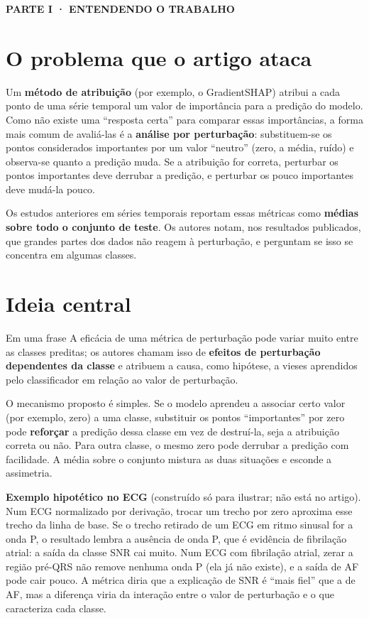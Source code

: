 \documentclass[11pt,a4paper]{article}
\newcommand{\partbar}[1]{\par\vspace{1.2em}\noindent\colorbox{black!80}{\parbox{\dimexpr\linewidth-2\fboxsep}{\color{white}\bfseries\sffamily\MakeUppercase{#1}}}\par\vspace{0.4em}}
\begin{document}
\partbar{Parte I · Entendendo o trabalho}

\section{O problema que o artigo ataca}
Um \textbf{método de atribuição} (por exemplo, o GradientSHAP) atribui a cada ponto de uma série temporal um valor de importância para a predição do modelo. Como não existe uma “resposta certa” para comparar essas importâncias, a forma mais comum de avaliá-las é a \textbf{análise por perturbação}: substituem-se os pontos considerados importantes por um valor “neutro” (zero, a média, ruído) e observa-se quanto a predição muda. Se a atribuição for correta, perturbar os pontos importantes deve derrubar a predição, e perturbar os pouco importantes deve mudá-la pouco.

Os estudos anteriores em séries temporais reportam essas métricas como \textbf{médias sobre todo o conjunto de teste}. Os autores notam, nos resultados publicados, que grandes partes dos dados não reagem à perturbação, e perguntam se isso se concentra em algumas classes.

\section{Ideia central}
\begin{infobox}[note]{Em uma frase}
A eficácia de uma métrica de perturbação pode variar muito entre as classes preditas; os autores chamam isso de \textbf{efeitos de perturbação dependentes da classe} e atribuem a causa, como hipótese, a vieses aprendidos pelo classificador em relação ao valor de perturbação.
\end{infobox}
O mecanismo proposto é simples. Se o modelo aprendeu a associar certo valor (por exemplo, zero) a uma classe, substituir os pontos “importantes” por zero pode \textbf{reforçar} a predição dessa classe em vez de destruí-la, seja a atribuição correta ou não. Para outra classe, o mesmo zero pode derrubar a predição com facilidade. A média sobre o conjunto mistura as duas situações e esconde a assimetria.

\textbf{Exemplo hipotético no ECG} (construído só para ilustrar; não está no artigo). Num ECG normalizado por derivação, trocar um trecho por zero aproxima esse trecho da linha de base. Se o trecho retirado de um ECG em ritmo sinusal for a onda P, o resultado lembra a ausência de onda P, que é evidência de fibrilação atrial: a saída da classe SNR cai muito. Num ECG com fibrilação atrial, zerar a região pré-QRS não remove nenhuma onda P (ela já não existe), e a saída de AF pode cair pouco. A métrica diria que a explicação de SNR é “mais fiel” que a de AF, mas a diferença viria da interação entre o valor de perturbação e o que caracteriza cada classe.
\end{document}
